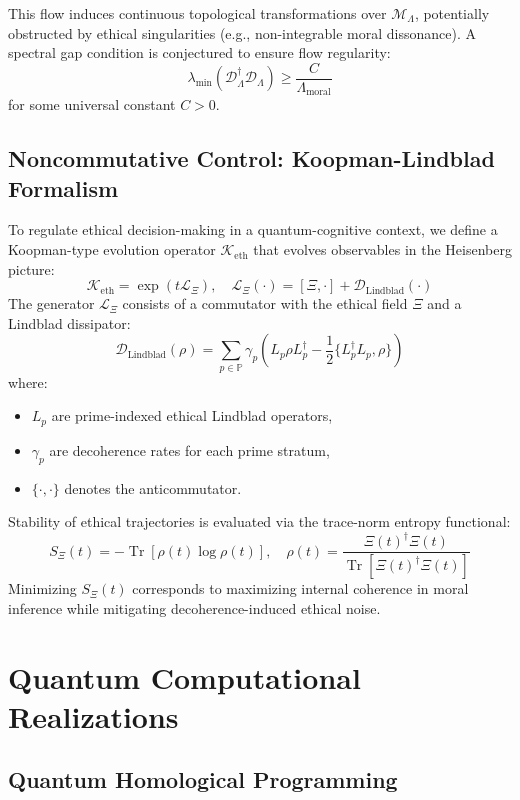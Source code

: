 \documentclass{article}
\theoremstyle{plain}
\theoremstyle{claimstyle}
\begin{document}
This flow induces continuous topological transformations over $\mathcal{M}_\Lambda$, potentially obstructed by ethical singularities (e.g., non-integrable moral dissonance). A spectral gap condition is conjectured to ensure flow regularity:
\[
\lambda_{\min}(\mathcal{D}_\Lambda^\dagger \mathcal{D}_\Lambda) \geq \frac{C}{\Lambda_{\mathrm{moral}}}
\]
for some universal constant $C > 0$.

\subsection{Noncommutative Control: Koopman-Lindblad Formalism}

To regulate ethical decision-making in a quantum-cognitive context, we define a Koopman-type evolution operator $\mathcal{K}_{\mathrm{eth}}$ that evolves observables in the Heisenberg picture:
\[
\mathcal{K}_{\mathrm{eth}} = \exp(t \mathcal{L}_\Xi), \quad \mathcal{L}_\Xi(\cdot) = [\Xi, \cdot] + \mathcal{D}_{\mathrm{Lindblad}}(\cdot)
\]
The generator $\mathcal{L}_\Xi$ consists of a commutator with the ethical field $\Xi$ and a Lindblad dissipator:
\[
\mathcal{D}_{\mathrm{Lindblad}}(\rho) = \sum_{p \in \mathbb{P}} \gamma_p \left( L_p \rho L_p^\dagger - \frac{1}{2}\{ L_p^\dagger L_p, \rho \} \right)
\]
where:
\begin{itemize}
    \item $L_p$ are prime-indexed ethical Lindblad operators,
    \item $\gamma_p$ are decoherence rates for each prime stratum,
    \item $\{\cdot, \cdot\}$ denotes the anticommutator.
\end{itemize}

Stability of ethical trajectories is evaluated via the trace-norm entropy functional:
\[
S_\Xi(t) = -\operatorname{Tr}[\rho(t) \log \rho(t)], \quad \rho(t) = \frac{\Xi(t)^\dagger \Xi(t)}{\operatorname{Tr}[\Xi(t)^\dagger \Xi(t)]}
\]
Minimizing $S_\Xi(t)$ corresponds to maximizing internal coherence in moral inference while mitigating decoherence-induced ethical noise.

\section{Quantum Computational Realizations}

\subsection{Quantum Homological Programming}
\end{document}
